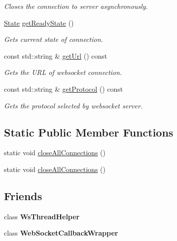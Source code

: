 \begin{DoxyCompactItemize}
\begin{DoxyCompactList}\small\item\em Closes the connection to server asynchronously. \end{DoxyCompactList}\item 
\hyperlink{classnetwork_1_1WebSocket_a60680efaa16031262c8c50409356aa20}{State} \hyperlink{classnetwork_1_1WebSocket_aebd52c7b7089db891e191e19dc474506}{get\+Ready\+State} ()
\begin{DoxyCompactList}\small\item\em Gets current state of connection. \end{DoxyCompactList}\item 
\mbox{\label{classnetwork_1_1WebSocket_ab94d69cba87fd51fdace3328b5d99e43}} 
const std\+::string \& \hyperlink{classnetwork_1_1WebSocket_ab94d69cba87fd51fdace3328b5d99e43}{get\+Url} () const
\begin{DoxyCompactList}\small\item\em Gets the U\+RL of websocket connection. \end{DoxyCompactList}\item 
\mbox{\label{classnetwork_1_1WebSocket_a48b5c07c30e5343459ec15576a2bace1}} 
const std\+::string \& \hyperlink{classnetwork_1_1WebSocket_a48b5c07c30e5343459ec15576a2bace1}{get\+Protocol} () const
\begin{DoxyCompactList}\small\item\em Gets the protocol selected by websocket server. \end{DoxyCompactList}\end{DoxyCompactItemize}
\subsection*{Static Public Member Functions}
\begin{DoxyCompactItemize}
\item 
static void \hyperlink{classnetwork_1_1WebSocket_a361327851f089c1fa506cc1d7bc6359b}{close\+All\+Connections} ()
\item 
static void \hyperlink{classnetwork_1_1WebSocket_a3e2130b9d28fffa6dbb00eee933ff914}{close\+All\+Connections} ()
\end{DoxyCompactItemize}
\subsection*{Friends}
\begin{DoxyCompactItemize}
\item 
\mbox{\label{classnetwork_1_1WebSocket_afc3008491acf0c382a9b383dab80ca6d}} 
class {\bfseries Ws\+Thread\+Helper}
\item 
\mbox{\label{classnetwork_1_1WebSocket_ac3bb118e21465a4ef8b5c4a1891d0b4e}} 
class {\bfseries Web\+Socket\+Callback\+Wrapper}
\end{DoxyCompactItemize}


